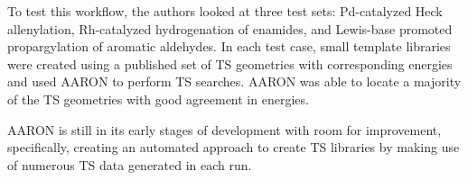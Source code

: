 \documentclass[preprint, 11pt]{elsarticle} %
\begin{document}

To test this workflow, the authors looked at three test sets: Pd-catalyzed Heck allenylation, Rh-catalyzed hydrogenation of enamides, and Lewis-base promoted propargylation of aromatic aldehydes.
In each test case, small template libraries were created using a published set of TS geometries with corresponding energies and used AARON to perform TS searches.
AARON was able to locate a majority of the TS geometries with good agreement in energies.

AARON is still in its early stages of development with room for improvement, specifically, creating an automated approach to create TS libraries by making use of numerous TS data generated in each run.

\end{document}
